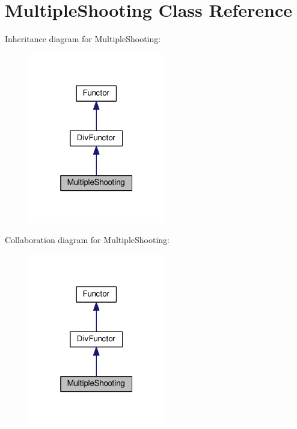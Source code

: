 \hypertarget{classMultipleShooting}{}\section{Multiple\+Shooting Class Reference}
\label{classMultipleShooting}


Inheritance diagram for Multiple\+Shooting\+:
\nopagebreak
\begin{figure}[H]
\begin{center}
\leavevmode
\includegraphics[width=169pt]{classMultipleShooting__inherit__graph}
\end{center}
\end{figure}


Collaboration diagram for Multiple\+Shooting\+:
\nopagebreak
\begin{figure}[H]
\begin{center}
\leavevmode
\includegraphics[width=169pt]{classMultipleShooting__coll__graph}
\end{center}
\end{figure}
